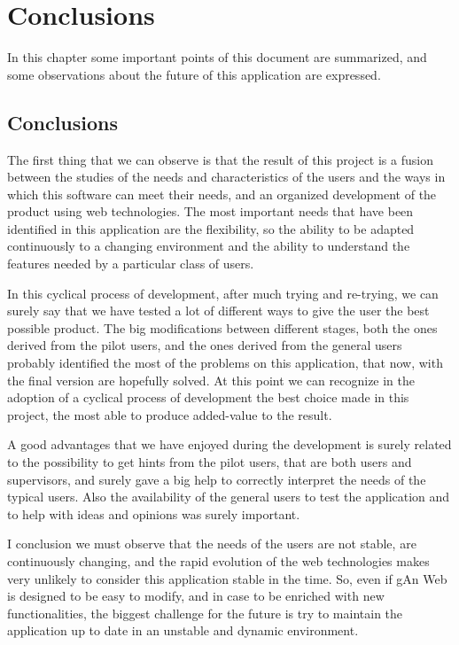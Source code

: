 
\chapter{Conclusions} %

\label{Chapter 10} %


In this chapter some important points of this document are summarized, and some observations about the future of this application are expressed.

\section{Conclusions}
The first thing that we can observe is that the result of this project is a fusion between the studies of the needs and characteristics of the users and the ways in which this software can meet their needs, and an organized development of the product using web technologies. The most important needs that have been identified in this application are the flexibility, so the ability to be adapted continuously to a changing environment and the ability to understand the features needed by a particular class of users.


In this cyclical process of development, after much trying and re-trying, we can surely say that we have tested a lot of different ways to give the user the best possible product. The big modifications between different stages, both the ones derived from the pilot users, and the ones derived from the general users probably identified the most of the problems on this application, that now, with the final version are hopefully solved. At this point we can recognize in the adoption of a cyclical process of development the best choice made in this project, the most able to produce added-value to the result.

A good advantages that we have enjoyed during the development is surely related to the possibility to get hints from the pilot users, that are both users and supervisors, and surely gave a big help to correctly interpret the needs of the typical users. Also the availability of the general users to test the application and to help with ideas and opinions was surely important.

I conclusion we must observe that the needs of the users are not stable, are continuously changing, and the rapid evolution of the web technologies makes very unlikely to consider this application stable in the time. So, even if gAn Web is designed to be easy to modify, and in case to be enriched with new functionalities, the biggest challenge for the future is try to maintain the application up to date in an unstable and dynamic environment.  

